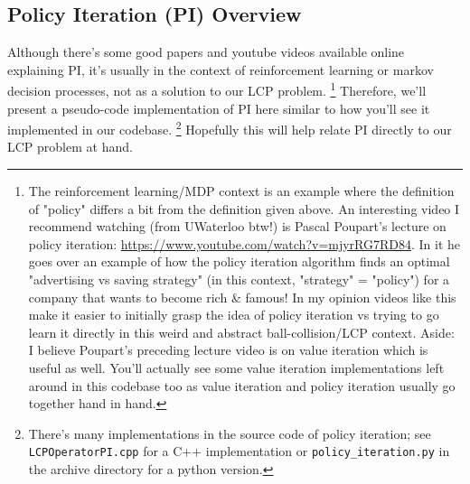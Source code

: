 \documentclass[12pt]{article}
\begin{document}
\subsection{Policy Iteration (PI) Overview}

Although there's some good papers and youtube videos available online explaining PI,
it's usually in the context of reinforcement learning or markov decision processes,
not as a solution to our LCP problem.
\footnote{
    The reinforcement learning/MDP context is an example where
    the definition of "policy" differs a bit from the definition given above.
    An interesting video I recommend watching (from UWaterloo btw!) is Pascal Poupart's
    lecture on policy iteration: \href{https://www.youtube.com/watch?v=mjyrRG7RD84}{https://www.youtube.com/watch?v=mjyrRG7RD84}.
    In it he goes over an example of how the policy iteration algorithm
    finds an optimal "advertising vs saving strategy" (in this context, "strategy" = "policy")
    for a company that wants to become rich \& famous!
    In my opinion videos like this make it easier to initially grasp the idea of policy iteration
    vs trying to go learn it directly in this weird and abstract ball-collision/LCP context.
    Aside: I believe Poupart's preceding lecture video is on value iteration which is useful as well.
    You'll actually see some value iteration implementations left around in this codebase too as
    value iteration and policy iteration usually go together hand in hand.
}
Therefore, we'll present a pseudo-code implementation of PI here similar to how you'll see it implemented in our codebase.
\footnote{
    There's many implementations in the source code of policy iteration;
    see \texttt{LCPOperatorPI.cpp} for a C++ implementation or
    \texttt{policy\_iteration.py} in the archive directory for a python version.
}
Hopefully this will help relate PI directly to our LCP problem at hand.
\pagebreak
\end{document}
